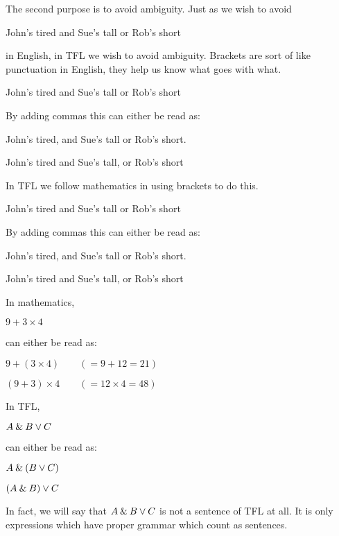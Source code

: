 The second purpose is to avoid ambiguity.
Just as we wish to avoid
\begin{center}
John's tired and Sue's tall or Rob's short
\end{center}
in English, in TFL we wish to avoid ambiguity.
Brackets are sort of like punctuation in English, they help us know what goes with what.
\begin{earg}
\item[\ex{engamb}] John's tired and Sue's tall or Rob's short
\end{earg}
By adding commas this can either be read as:
\begin{earg}
\item[\ex{engamb1}] John's tired, and Sue's tall or Rob's short.
\item[\ex{engamb2}] John's tired and Sue's tall, or Rob's short
\end{earg}
In TFL we follow mathematics in using brackets to do this.
\begin{earg}
\item[\ex{engamb}] John's tired and Sue's tall or Rob's short
\end{earg}
By adding commas this can either be read as:
\begin{earg}
\item[\ex{engamb1}] John's tired, and Sue's tall or Rob's short.
\item[\ex{engamb2}] John's tired and Sue's tall, or Rob's short
\end{earg}
In mathematics,
\begin{earg}
\item[\ex{mathamb}] $9 + 3 \times 4$
\end{earg}
can either be read as:
\begin{earg}
\item[\ex{mathamb1}] $9 + (3 \times 4) \qquad(=9+12=21)$
\item[\ex{mathamb2}] $(9+3) \times 4 \qquad(=12\times 4=48)$
\end{earg}
In TFL,
\begin{earg}
\item[\ex{mathamb}] $A\mathbin{\&} B\vee C$
\end{earg}
can either be read as:
\begin{earg}
\item[\ex{mathamb1}] $A\mathbin{\&} (B\vee C)$
\item[\ex{mathamb2}] $(A\mathbin{\&} B)\vee C$
\end{earg}
In fact, we will say that $A\mathbin{\&} B\vee C$ is not a sentence of TFL at all. It is only expressions which have proper grammar which count as sentences.

